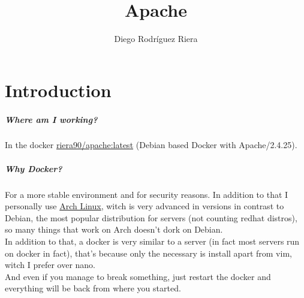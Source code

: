 \documentclass[a4paper,10pt]{article}
\title{Apache}
\author{Diego Rodríguez Riera}
\newcommand\tab[1][1cm]{\hspace*{#1}}
\begin{document}
\maketitle
\pagebreak
\tableofcontents
\pagebreak

\section{Introduction}
\subparagraph{Where am I working?}
In the docker \href{https://hub.docker.com/r/riera90/apache/}{riera90/apache:latest} (Debian based Docker with Apache/2.4.25).
\subparagraph{Why Docker?}
For a more stable environment and for security reasons.
In addition to that I personally use \href{https://www.archlinux.org/}{Arch Linux}, witch is very advanced in versions in contrast to Debian, the most popular distribution for servers (not counting redhat distros), so many things that work on Arch doesn't dork on Debian.\vspace{0.5cm}\\\tab
In addition to that, a docker is very similar to a server (in fact most servers run on docker in fact), that's because only the necessary is install apart from vim, witch I prefer over nano.\vspace{0.5cm}\\\tab
And even if you manage to break something, just restart the docker and everything will be back from where you started.
\end{document}
